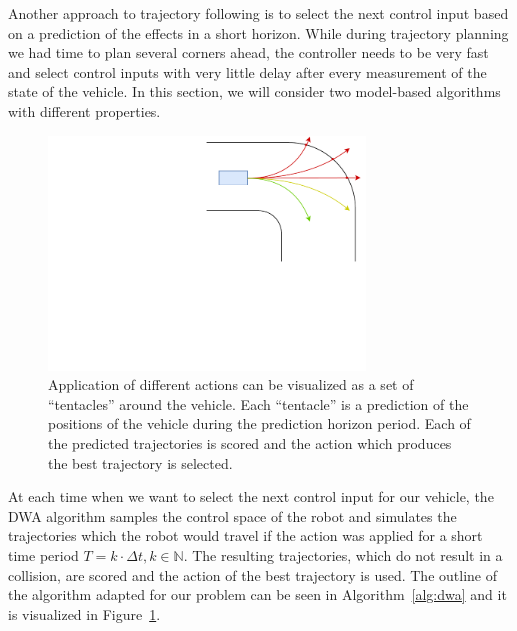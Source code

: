 Another approach to trajectory following is to select the next control input based on a prediction of the effects in a short horizon. While during trajectory planning we had time to plan several corners ahead, the controller needs to be very fast and select control inputs with very little delay after every measurement of the state of the vehicle. In this section, we will consider two model-based algorithms with different properties.

\begin{figure}
	\centering
	\includegraphics[trim=200 170 0 0, clip, width=0.75\textwidth]{../img/dwa_tentacles}
	\caption{Application of different actions can be visualized as a set of ``tentacles'' around the vehicle. Each ``tentacle'' is a prediction of the positions of the vehicle during the prediction horizon period. Each of the predicted trajectories is scored and the action which produces the best trajectory is selected.}
	\label{fig:dwa}
\end{figure}

At each time when we want to select the next control input for our vehicle, the DWA algorithm \cite{DWA} samples the control space of the robot and simulates the trajectories which the robot would travel if the action was applied for a short time period $T=k\cdot \Delta t,k\in\mathbb{N}$. The resulting trajectories, which do not result in a collision, are scored and the action of the best trajectory is used. The outline of the algorithm adapted for our problem can be seen in Algorithm~\ref{alg:dwa} and it is visualized in Figure~\ref{fig:dwa}.

